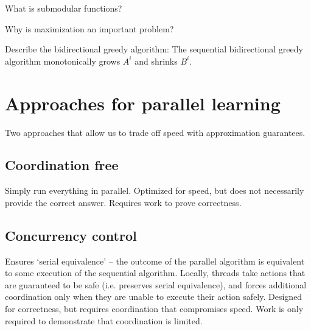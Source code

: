 \documentclass{article} %
\begin{document}
What is submodular functions?

Why is maximization an important problem?

Describe the bidirectional greedy algorithm:
The sequential bidirectional greedy \cite{buchbinder2012} algorithm monotonically grows $A^i$ and shrinks $B^i$.









\section{Approaches for parallel learning}

Two approaches that allow us to trade off speed with approximation guarantees.

\subsection{Coordination free}
Simply run everything in parallel.
Optimized for speed, but does not necessarily provide the correct answer.
Requires work to prove correctness.

\subsection{Concurrency control}
Ensures `serial equivalence' -- the outcome of the parallel algorithm is equivalent to some execution of the sequential algorithm.
Locally, threads take actions that are guaranteed to be safe (i.e. preserves serial equivalence), and forces additional coordination only when they are unable to execute their action safely.
Designed for correctness, but requires coordination that compromises speed.
Work is only required to demonstrate that coordination is limited.
\end{document}
